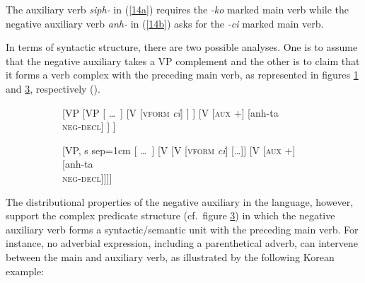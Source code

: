 \documentclass[output=paper]{langsci/langscibook}
\begin{document}
{The auxiliary verb {\it siph-} in (\ref{14a}) requires the
{\it -ko} marked main verb while the negative auxiliary
 verb {\it anh-} in (\ref{14b}) asks for the {\it -ci} marked main verb.




In terms of syntactic structure, there
are two possible analyses.  One is to assume that the negative auxiliary
takes
a VP complement and the other is to claim that it forms a verb complex
with the preceding main verb, as
represented in figures \ref{fig:3a} and \ref{fig:3b}, respectively (\citep{Kim:16}).

\begin{figure}[h!]
	\begin{subfigure}[b]{0.48\textwidth}
		\begin{forest}
			[VP
				[VP
					[ \dots\ ] 
					[V {[\textsc{vform} \textit{ci}]}
					]
					]
				[V {[\textsc{aux $+$}]}
					[anh-ta\\ \textsc{neg-decl}]
				]
			]	
		\end{forest}
	\caption{}\label{fig:3a}
		\end{subfigure}	
\hfill
	\begin{subfigure}[b]{0.48\textwidth}
		\begin{forest}
			[VP, s sep=1cm
				[ \dots\ ]
				[V
					[V {[\textsc{vform} \textit{ci}]}
						[\dots]]
					[V {[\textsc{aux $+$}]}
						[anh-ta\\ \textsc{neg-decl}]]]]
		\end{forest}
	\caption{}\label{fig:3b}	
		\end{subfigure}
	\caption{}
\end{figure}



\noindent The distributional properties of
 the negative auxiliary in the language, however, support
 the complex predicate structure (cf.\ figure \ref{fig:3b}) in which the negative auxiliary verb
forms a syntactic/semantic unit with the preceding main verb.
For instance, no adverbial expression, including
a parenthetical adverb, can intervene between
the main and auxiliary verb, as illustrated by the
following Korean example:

}
\end{document}
